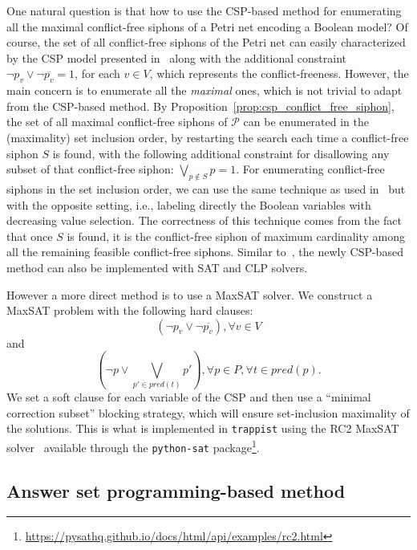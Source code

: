 \documentclass[preprint,12pt]{elsarticle}
\begin{document}
One natural question is that how to use the CSP-based method for enumerating all the maximal conflict-free siphons of a Petri net encoding a Boolean model?
Of course, the set of all conflict-free siphons of the Petri net can easily characterized by the CSP model presented in~\cite{nabli2016enumerating} along with the additional constraint \(\neg p_v \vee \neg \overline{p_v} = 1\), for each \(v \in V\), which represents the conflict-freeness.
However, the main concern is to enumerate all the \emph{maximal} ones, which is not trivial to adapt from the CSP-based method.
By Proposition~\ref{prop:csp_conflict_free_siphon}, the set of all maximal conflict-free siphons of \(\mathcal{P}\) can be enumerated in the (maximality) set inclusion order, by restarting the search each time a conflict-free siphon \(S\) is found, with the following additional constraint for disallowing any subset of that conflict-free siphon: \(\bigvee_{p \not \in S} p = 1\).
For enumerating conflict-free siphons in the set inclusion order, we can use the same technique as used in~\cite{nabli2016enumerating} but with the opposite setting, i.e., labeling directly the Boolean variables with decreasing value selection.
The correctness of this technique comes from the fact that once \(S\) is found, it is the conflict-free siphon of maximum cardinality among all the remaining feasible conflict-free siphons.
Similar to~\cite{nabli2016enumerating}, the newly CSP-based method can also be implemented with SAT and CLP solvers.

However a more direct method is to use a MaxSAT solver.
We construct a MaxSAT problem with the following hard clauses:
\[
  (\neg p_v \vee \neg \overline{p_v}), \forall v \in V
\]
and
\[
  (\neg p \vee \bigvee_{p' \in pred(t)}p'), \forall p \in P, \forall t \in pred(p).
\]
We set a soft clause for each variable of the CSP and then use a ``minimal correction subset'' blocking strategy, which will ensure set-inclusion maximality of the solutions.
This is what is implemented in \texttt{trappist} using the RC2 MaxSAT solver~\cite{DBLP:journals/jsat/IgnatievMM19} available through the \texttt{python-sat} package\footnote{\url{https://pysathq.github.io/docs/html/api/examples/rc2.html}}.

\subsection{Answer set programming-based method}
\label{subsec:computation_asp}
\end{document}
